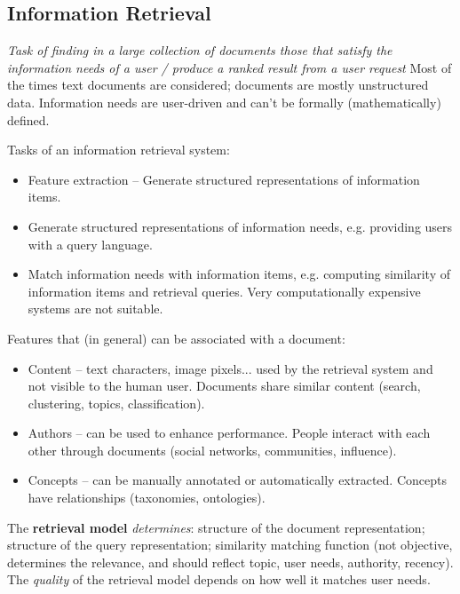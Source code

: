 
  \subsection{Information Retrieval} %
  \label{sub:information_retrieval}
    \emph{Task of finding in a large collection of documents those that satisfy the information needs of a user / produce a ranked result from a user request} Most of the times text documents are considered; documents are mostly unstructured data. Information needs are user-driven and can't be formally (mathematically) defined.

    Tasks of an information retrieval system:
    \begin{itemize}
      \item Feature extraction -- Generate structured representations of information items.
      \item Generate structured representations of information needs, e.g. providing users with a query language.
      \item Match information needs with information items, e.g. computing similarity of information items and retrieval queries. Very computationally expensive systems are not suitable.
    \end{itemize}

    Features that (in general) can be associated with a document:
    \begin{itemize}
      \item Content -- text characters, image pixels... used by the retrieval system and not visible to the human user. Documents share similar content (search, clustering, topics, classification).
      \item Authors -- can be used to enhance performance. People interact with each other through documents (social networks, communities, influence).
      \item Concepts -- can be manually annotated or automatically extracted. Concepts have relationships (taxonomies, ontologies).
    \end{itemize}

    The \textbf{retrieval model} \emph{determines}: structure of the document representation; structure of the query representation; similarity matching function (not objective, determines the relevance, and should reflect topic, user needs, authority, recency). The \emph{quality} of the retrieval model depends on how well it matches user needs.

